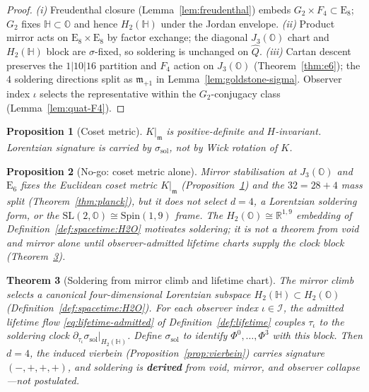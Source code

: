 \documentclass[11pt]{article}
\theoremstyle{plain}
\newtheorem{theorem}{Theorem}[section]
\newtheorem{proposition}[theorem]{Proposition}
\theoremstyle{definition}
\theoremstyle{remark}
\numberwithin{equation}{section}
\newcommand{\R}{\mathbb{R}}
\newcommand{\Quat}{\mathbb{H}}
\newcommand{\Oct}{\mathbb{O}}
\newcommand{\jalg}{J_3(\mathbb{O})}
\newcommand{\E}[1]{\mathrm{E}_{#1}}
\newcommand{\Spin}{\mathrm{Spin}}
\newcommand{\orderparam}{\Phi}
\begin{document}
\begin{proof}
\emph{(i)} Freudenthal closure (Lemma~\ref{lem:freudenthal}) embeds
$G_2\times F_4\subset\E{8}$; $G_2$ fixes $\Quat\subset\Oct$ and hence
$H_2(\Quat)$ under the Jordan envelope. \emph{(ii)} Product mirror acts on
$\E{8}\times\E{8}$ by factor exchange; the diagonal $\jalg$ chart and
$H_2(\Quat)$ block are $\sigma$-fixed, so soldering is unchanged on
$\hat Q$. \emph{(iii)} Cartan descent preserves the $1|10|16$ partition and
$F_4$ action on $\jalg$ (Theorem~\ref{thm:e6}); the $4$ soldering directions
split as $\mathfrak{m}_{+1}$ in Lemma~\ref{lem:goldstone-sigma}. Observer
index $\iota$ selects the representative within the $G_2$-conjugacy class
(Lemma~\ref{lem:quat-F4}).
\end{proof}

\begin{proposition}[Coset metric]\label{prop:coset-metric}
$K|_{\mathfrak{m}}$ is positive-definite and $H$-invariant. Lorentzian
signature is carried by $\sigma_{\mathrm{sol}}$, not by Wick rotation of $K$.
\end{proposition}

\begin{proposition}[No-go: coset metric alone]\label{prop:coset-nogo}
Mirror stabilisation at $\jalg$ and $\E{6}$ fixes the \emph{Euclidean}
coset metric $K|_{\mathfrak{m}}$ (Proposition~\ref{prop:coset-metric}) and
the $32=28+4$ mass split (Theorem~\ref{thm:planck}), but it does \emph{not}
select $d=4$, a Lorentzian soldering form, or the
$\mathrm{SL}(2,\Oct)\cong\Spin(1,9)$ frame. The $H_2(\Oct)\cong\R^{1,9}$
embedding of Definition~\ref{def:spacetime:H2O} motivates soldering; it is
not a theorem from void and mirror alone until observer-admitted lifetime
charts supply the clock block (Theorem~\ref{thm:spacetime:soldering-derived}).
\end{proposition}

\begin{theorem}[Soldering from mirror climb and lifetime chart]
\label{thm:spacetime:soldering-derived}
The mirror climb selects a canonical four-dimensional Lorentzian subspace
$H_2(\Quat)\subset H_2(\Oct)$ (Definition~\ref{def:spacetime:H2O}). For each
observer index $\iota\in\mathcal{I}$, the admitted lifetime flow
\eqref{eq:lifetime-admitted} of Definition~\ref{def:lifetime} couples
$\tau_\iota$ to the soldering clock
$\partial_{\tau_\iota}\sigma_{\mathrm{sol}}|_{H_2(\Quat)}$. Define
$\sigma_{\mathrm{sol}}$ to identify
$\orderparam^0,\ldots,\orderparam^3$ with this block. Then $d=4$, the
induced vierbein (Proposition~\ref{prop:vierbein}) carries signature
$(-,+,+,+)$, and soldering is \textbf{derived} from void, mirror, and
observer collapse---not postulated.
\end{theorem}
\end{document}
